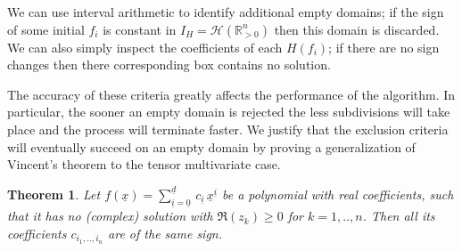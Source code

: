 \documentclass{sig-alternate}
\newtheorem{theorem}{Theorem}[section]
\newcommand{\dott}{{..}}
\def\RR{\mathbb{R}}
\newcommand{\uvec}[1]{\underline{#1}}
\begin{document}
We can use interval arithmetic to identify additional empty domains; if
the sign of some initial $f_i$ is constant in $I_H= \mathcal
H(\RR_{>0}^n)$ then this domain is discarded. We can also simply inspect the
coefficients of each $H(f_i)$; if there are no sign changes then there
corresponding box contains no solution.

The accuracy of these criteria greatly affects the performance of the
algorithm. In particular, the sooner an empty domain is rejected the
less subdivisions will take place and the process will terminate
faster. We justify that the exclusion criteria will eventually succeed
on an empty domain by proving a generalization of Vincent's theorem to
the tensor multivariate case.

\begin{theorem} \label{vincentxyz} Let $f (\uvec x) = \sum_{\uvec
    i=\uvec 0}^{\uvec d} \, c_{\uvec i} \, \uvec x^{\uvec i}$ be a
  polynomial with real coefficients, such that it has no (complex)
  solution with $\Re (z_k) \ge 0$ for $k = 1, \dott, n$. Then all its
  coefficients $c_{i_1, \dott, i_n}$ are of the same sign.
\end{theorem}
\end{document}
